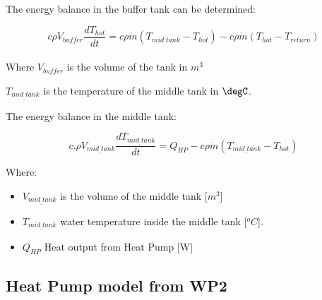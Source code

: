 The energy balance in the buffer tank can be determined:

\begin{equation}
c\rho V_{buffer}\frac{dT_{hot}}{dt}= c\rho \dot{m}(T_{mid_{\_}tank}-T_{hot}) - c\rho \dot{m}(T_{hot}-T_{return})
\end{equation}
\\
Where $V_{buffer}$ is the volume of the tank in $m^3$ 

$T_{mid_{\_}tank}$ is the temperature of the middle tank in $\degC$.

The energy balance in the middle tank:




\begin{equation}
c.\rho V_{mid_{\_}tank}\frac{dT_{mid_{\_}tank}}{dt}= Q_{HP} - c\rho \Dot{m}(T_{mid_{\_}tank} - T_{hot})
\end{equation}

Where:
\begin{itemize}
    \item $V_{mid_{\_}tank}$ is the volume of the middle tank [$m^3$]
    \item $T_{mid_{\_}tank}$ water temperature inside the middle tank [$^oC$]. 
    \item $Q_{HP}$ Heat output from Heat Pump [W] 
\end{itemize}
 

\subsection{Heat Pump model from WP2}

